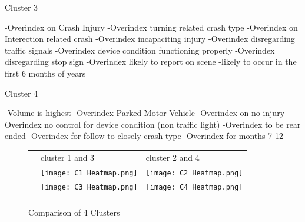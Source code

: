 \documentclass[conference]{IEEEtran}
\begin{document}
\begin{center}
Cluster 3 \linebreak
\begin{flushleft}
-Overindex on Crash Injury \linebreak
-Overindex turning related crash type \linebreak
-Overindex on Interection related crash \linebreak
-Overindex incapaciting injury \linebreak
-Overindex disregarding traffic signals \linebreak
-Overindex device condition functioning properly \linebreak
-Overindex disregarding stop sign \linebreak
-Overindex likely to report on scene \linebreak
-likely to occur in the first 6 months of years \linebreak
\end{flushleft}

Cluster 4 \linebreak
\begin{flushleft}
-Volume is highest \linebreak
-Overindex Parked Motor Vehicle \linebreak
-Overindex on no injury \linebreak
-Overindex no control for device condition (non traffic light) \linebreak
-Overindex to be rear ended \linebreak
-Overindex for follow to closely crash type \linebreak
-Overindex for months 7-12 \linebreak
\end{flushleft}


\begin{figure}[h!]
	
	\caption{Comparison of 4 Clusters} %
	\bigskip
	\centering
	\begin{tabular}{@{} r @{} *{2}{M{0.13\textheight}} @{}}
	&    cluster 1 and 3 & cluster 2 and 4 \\
	\llap{\quad} & \texttt{[image: C1\_Heatmap.png]} & \texttt{[image: C2\_Heatmap.png]} \\ \addlinespace

	\llap{\quad} & \texttt{[image: C3\_Heatmap.png]} & \texttt{[image: C4\_Heatmap.png]} \\ \addlinespace
 

\end{tabular}
\end{figure}
\end{center}
\end{document}

